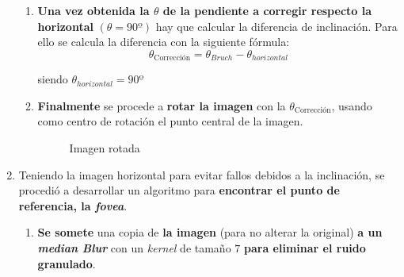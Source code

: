 \begin{enumerate}
\begin{enumerate}[label*=\arabic*.]
  \item \textbf{Una vez obtenida la $\theta$ de la pendiente a corregir
      respecto la horizontal} $\left( \theta = 90º \right)$ hay que
    calcular la diferencia de inclinación. Para ello se calcula la
    diferencia con la siguiente fórmula:
    \begin{equation*}
      \theta_\text{Corrección} = \theta_{Bruch} - \theta_{horizontal}
    \end{equation*}
    \begin{center}
      siendo $\theta_{horizontal} = 90º$
    \end{center}
  \item \textbf{Finalmente} se procede a \textbf{rotar la imagen} con
    la $\theta_{\text{Corrección}}$, usando como centro de rotación el
    punto central de la imagen.

      \begin{figure}[H]
        \caption{Imagen rotada}
        \centering \setlength\fboxsep{0pt} \setlength\fboxrule{0.5pt}
      \end{figure}

  \end{enumerate}

\item Teniendo la imagen horizontal para evitar fallos debidos a la
  inclinación, se procedió a desarrollar un algoritmo para
  \textbf{encontrar el punto de referencia, la \emph{\gls{fovea}}}.
  \begin{enumerate}[label*=\arabic*.]
  \item \textbf{Se somete} una copia de \textbf{la imagen} (para no
    alterar la original) \textbf{a un \emph{median
        Blur}} con un \emph{kernel} de
    tamaño $7$ \textbf{para eliminar el ruido granulado}.


\end{enumerate}
\end{enumerate}
